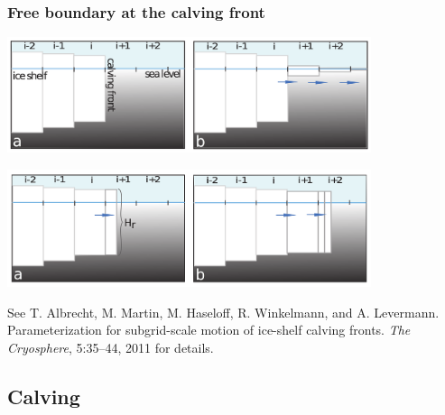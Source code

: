 \documentclass[hide notes,intlimits]{beamer}
\begin{document}
\begin{frame}
  \frametitle{Free boundary at the calving front}

  \begin{center}
    \includegraphics[width=0.8\textwidth]{albrecht-martin-figure-1}

    \includegraphics[width=0.8\textwidth]{albrecht-martin-figure-2}
  \end{center}

  See T. Albrecht, M. Martin, M. Haseloff, R. Winkelmann, and A.
  Levermann. Parameterization for subgrid-scale motion of ice-shelf
  calving fronts. \emph{The Cryosphere}, 5:35–44, 2011 for details.
\end{frame}

\subsection{Calving}
\label{sec:calving}
\end{document}

